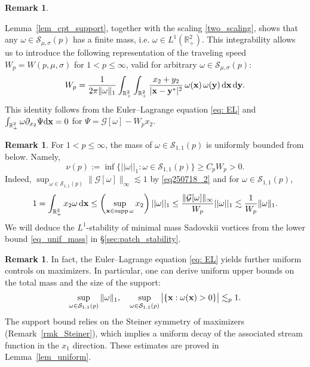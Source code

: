 \documentclass[11pt]{amsart}
\theoremstyle{definition}
\theoremstyle{definition}
\newtheorem{remark}[theorem]{Remark}
\numberwithin{equation}{section}
\newcommand{\0}{\emptyset}
\newcommand{\bfx}{{\bf x}}
\newcommand{\bfy}{{\bf y}}
\newcommand{\bbR}{\mathbb R}
\newcommand{\calG}{\mathcal G}
\newcommand{\calS}{\mathcal S}
\newcommand{\dd}{\mathrm{d}}
\begin{document}
			
			
			\begin{remark}\label{rmk_W_formula}
				
				Lemma~\ref{lem_cpt_support}, together with the scaling \eqref{two_scaling}, shows that any $\omega\in \calS_{\mu,\sigma}(p)$ has a finite mass, i.e. $\omega \in L^1(\bbR^2_+)$.
                This integrability allows us to introduce the following representation of the traveling speed $W_p = W(p, \mu, \sigma)$ for $1<p\leq \infty$, valid for arbitrary $\omega\in \calS_{\mu, \sigma}(p)$: 
				\begin{align}
					\label{formula_W}
					W_p
					=  \frac{1}{2\pi\|\omega\|_1} \int_{\mathbb{R}^2_+} \int_{\mathbb{R}^2_+} 
					\frac{x_2 + y_2}{|\bfx - \bfy^*|^2}\, \omega(\bfx) \,\omega (\bfy) \,  \dd \bfx \, \dd \bfy.
				\end{align}
				This identity follows from the Euler--Lagrange equation \eqref{eq: EL} and $\int_{\mathbb{R}^{2}_{+}}\omega \partial_{x_2}\Psi \dd \bfx=0$ for $\Psi=\calG[\omega]-W_px_2$. 
			\end{remark}
			
			
			\begin{remark}\label{lem_unif}
				For $1<p\leq \infty$, the mass of $\omega\in \calS_{1,1}(p)$ is uniformly bounded from below. Namely, 
				\begin{equation}
					\label{eq_unif_mass}
					\nu(p) := \inf\{||\omega||_{1} : \omega\in \calS_{1,1}(p)\}\geq C_pW_{p}>0.
				\end{equation}
				Indeed, $\sup_{\omega\in \calS_{1,1}(p)}\|\calG[\omega]\|_{\infty}\lesssim 1$ by \eqref{eq250718_2} and for $\omega\in \calS_{1,1}(p)$, 
				\begin{equation}
					\label{unif_mass_low}
					1 = \int_{\bbR^2_+} x_2 \omega \, \dd\bfx
					\leq \left(\sup_{\bfx \in \operatorname{supp} \omega} x_2\right) ||\omega||_{1}
					\leq \frac{\|\calG[\omega]\|_{\infty}}{W_p}||\omega||_{1}
					\lesssim \frac{1}{W_p}\|\omega\|_1.
				\end{equation}
				We will deduce the $L^{1}$-stability of minimal mass Sadovskii vortices from the lower bound \eqref{eq_unif_mass} in \S \ref{sec:patch_stability}.
			\end{remark}
			
			
			\begin{remark}\label{rmk_unif_bdd}
				In fact, the Euler--Lagrange equation \eqref{eq: EL} yields further uniform controls on maximizers.
				In particular, one can derive uniform upper bounds on the total mass and the size of the support:
				\begin{align*}
					\sup_{\omega \in \calS_{1,1}(p)} \|\omega\|_1,
					\quad
					\sup_{\omega \in \calS_{1,1}(p)} \big|\{\bfx : \omega(\bfx) > 0\}\big|
					\lesssim_p 1.
				\end{align*}
				The support bound relies on the Steiner symmetry of maximizers (Remark~\ref{rmk_Steiner}), which implies a uniform decay of the associated stream function in the $x_1$ direction.
				These estimates are proved in Lemma~\ref{lem_uniform}.
			\end{remark}
			
\end{document}

